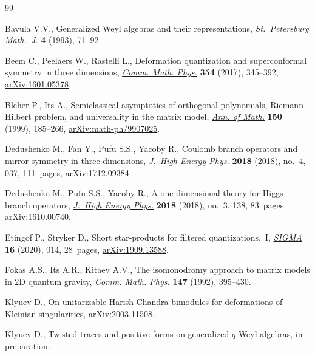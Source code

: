 \begin{thebibliography}{99}
\footnotesize\itemsep=0pt

Bavula V.V., Generalized {W}eyl algebras and their representations,
 \textit{St.~Petersburg Math.~J.} \textbf{4} (1993), 71--92.

Beem C., Peelaers W., Rastelli L., Deformation quantization and superconformal
 symmetry in three dimensions, \href{https://doi.org/10.1007/s00220-017-2845-6}{\textit{Comm. Math. Phys.}} \textbf{354} (2017),
 345--392, \href{https://arxiv.org/abs/1601.05378}{arXiv:1601.05378}.

Bleher P., Its A., Semiclassical asymptotics of orthogonal polynomials,
 {R}iemann--{H}ilbert problem, and universality in the matrix model,
 \href{https://doi.org/10.2307/121101}{\textit{Ann. of Math.}} \textbf{150} (1999), 185--266,
 \href{https://arxiv.org/abs/math-ph/9907025}{arXiv:math-ph/9907025}.

Dedushenko M., Fan Y., Pufu S.S., Yacoby R., Coulomb branch operators and
 mirror symmetry in three dimensions, \href{https://doi.org/10.1007/jhep04(2018)037}{\textit{J.~High Energy Phys.}}
 \textbf{2018} (2018), no.~4, 037, 111~pages, \href{https://arxiv.org/abs/1712.09384}{arXiv:1712.09384}.

Dedushenko M., Pufu S.S., Yacoby R., A one-dimensional theory for {H}iggs
 branch operators, \href{https://doi.org/10.1007/jhep03(2018)138}{\textit{J.~High Energy Phys.}} \textbf{2018} (2018), no.~3,
 138, 83~pages, \href{https://arxiv.org/abs/1610.00740}{arXiv:1610.00740}.

Etingof P., Stryker D., Short star-products for filtered quantizations,~{I},
 \href{https://doi.org/10.3842/SIGMA.2020.014}{\textit{SIGMA}} \textbf{16} (2020), 014, 28~pages, \href{https://arxiv.org/abs/1909.13588}{arXiv:1909.13588}.

Fokas A.S., Its A.R., Kitaev A.V., The isomonodromy approach to matrix models
 in {$2$}{D} quantum gravity, \href{https://doi.org/10.1007/BF02096594}{\textit{Comm. Math. Phys.}} \textbf{147} (1992),
 395--430.

Klyuev D., On unitarizable Harish-Chandra bimodules for deformations of
 {K}leinian singularities, \href{https://arxiv.org/abs/2003.11508}{arXiv:2003.11508}.

Klyuev D., Twisted traces and positive forms on generalized $q$-{W}eyl
 algebras, {i}n preparation.


\end{thebibliography}
